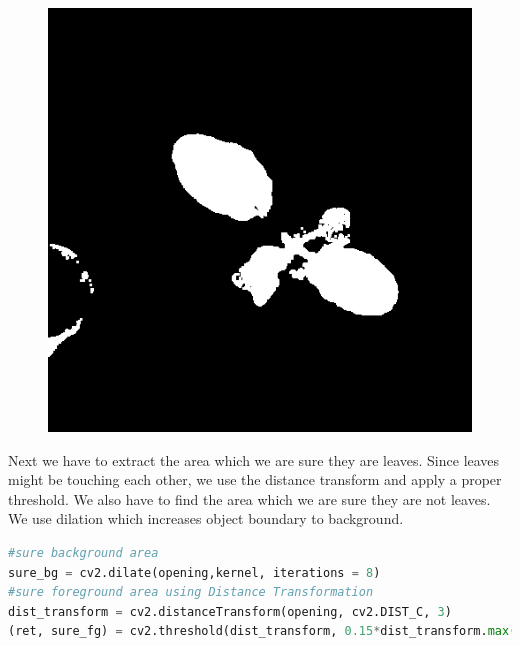 \documentclass[10pt]{article}
\begin{document}
\begin{figure}[H]
\includegraphics[width=\textwidth]{../example/grayscale_clean}
\end{figure}

\clearpage
Next we have to extract the area which we are sure they are leaves. Since leaves might be touching each other, we use the distance transform and apply a proper threshold. We also have to find the area which we are sure they are not leaves. We use dilation which increases object boundary to background.
\begin{lstlisting}[language=Python]
#sure background area
sure_bg = cv2.dilate(opening,kernel, iterations = 8)
#sure foreground area using Distance Transformation
dist_transform = cv2.distanceTransform(opening, cv2.DIST_C, 3)
(ret, sure_fg) = cv2.threshold(dist_transform, 0.15*dist_transform.max(), 255, 0)
\end{lstlisting}
\end{document}
